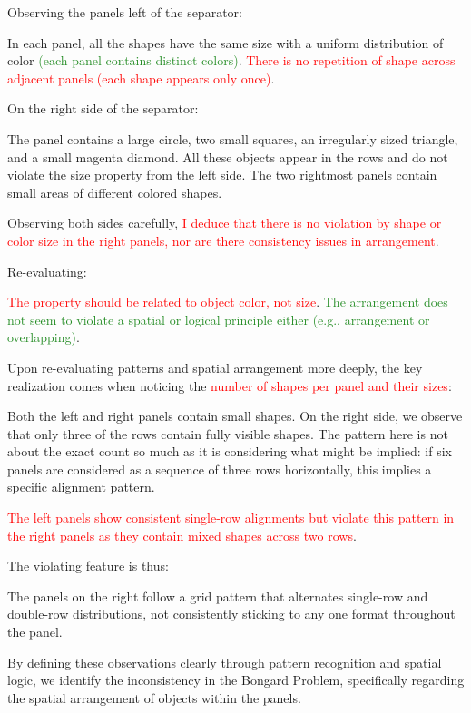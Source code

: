 \begin{tcolorbox}[breakable,enhanced jigsaw,opacityback=0,]
\begin{dialogue}
		Observing the panels left of the separator:
		
		In each panel, all the shapes have the same size with a uniform distribution of color \textcolor{ForestGreen}{(each panel contains distinct colors)}.
		\textcolor{red}{There is no repetition of shape across adjacent panels (each shape appears only once)}.
		
		On the right side of the separator:
		
		The panel contains a large circle, two small squares, an irregularly sized triangle, and a small magenta diamond. All these objects appear in the rows and do not violate the size property from the left side.
		The two rightmost panels contain small areas of different colored shapes.
		
		Observing both sides carefully, \textcolor{red}{I deduce that there is no violation by shape or color size in the right panels, nor are there consistency issues in arrangement}.
		
		Re-evaluating:
		
		\textcolor{red}{The property should be related to object color, not size}.
		\textcolor{ForestGreen}{The arrangement does not seem to violate a spatial or logical principle either (e.g., arrangement or overlapping)}.
		
		Upon re-evaluating patterns and spatial arrangement more deeply, the key realization comes when noticing the \textcolor{red}{number of shapes per panel and their sizes}:
		
		Both the left and right panels contain small shapes. On the right side, we observe that only three of the rows contain fully visible shapes.
		The pattern here is not about the exact count so much as it is considering what might be implied: if six panels are considered as a sequence of three rows horizontally, this implies a specific alignment pattern.
		
		\textcolor{red}{The left panels show consistent single-row alignments but violate this pattern in the right panels as they contain mixed shapes across two rows}.
		
		The violating feature is thus:
		
		{The panels on the right follow a grid pattern that alternates single-row and double-row distributions}, not consistently sticking to any one format throughout the panel.
		
		By defining these observations clearly through pattern recognition and spatial logic, we identify the inconsistency in the Bongard Problem, specifically regarding the spatial arrangement of objects within the panels.
	\end{dialogue}
	\label{fig:task2-bongard}
\end{tcolorbox}




